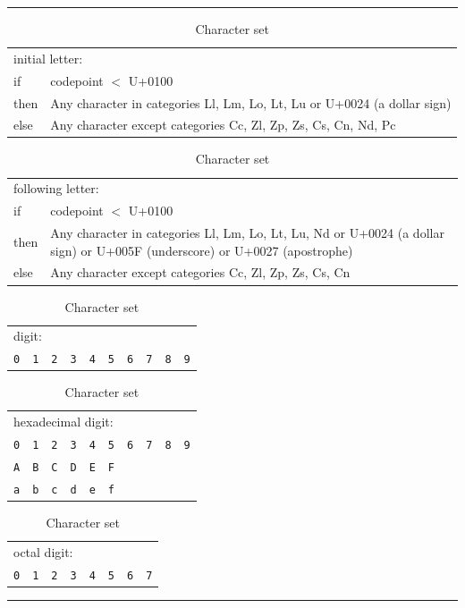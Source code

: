 \documentclass{overturerepchap}
\newcommand{\blankline}{\vspace{\baselineskip}}
\begin{document}
\begin{table}[ht]
\setlength{\tabcolsep}{3.5mm}
\setlength{\arraycolsep}{3.5mm}

\rule{\textwidth}{.5mm}
        \begin{tabular}{lp{13cm}}
        \multicolumn{2}{l}{\rm initial letter:} \\
        if   & codepoint $<$ U+0100 \\
        then &  Any character in categories Ll, Lm, Lo, Lt, Lu or U+0024 (a dollar sign) \\
        else & Any character except categories Cc, Zl, Zp, Zs, Cs,
                Cn, Nd, Pc \\
    \end{tabular}

\blankline
\begin{tabular}{lp{13cm}}
        \multicolumn{2}{l}{following letter: }\\
        if   & codepoint $<$ U+0100 \\
        then & Any character in categories Ll, Lm, Lo, Lt, Lu, Nd or 
               U+0024 (a dollar sign) or U+005F (underscore) or U+0027 (apostrophe) \\
        else & Any character except categories Cc, Zl, Zp, Zs, Cs, Cn 
    \end{tabular}

\blankline
    \begin{tabular}{*{10}{l}}
        \multicolumn{10}{l}{digit:} \\
        {\tt 0}
        & {\tt 1} 
        & {\tt 2} 
        & {\tt 3} 
        & {\tt 4} 
        & {\tt 5}
        & {\tt 6} 
        & {\tt 7} 
        & {\tt 8} 
        & {\tt 9} 
     \end{tabular}

\blankline
    \begin{tabular}{*{10}{l}}
        \multicolumn{10}{l}{hexadecimal digit:} \\
        {\tt 0} & {\tt 1} & {\tt 2} & {\tt 3} & {\tt 4} & {\tt 5} & {\tt 6} & {\tt 7} & {\tt 8} & {\tt 9} \\
        {\tt A} & {\tt B} & {\tt C} & {\tt D} & {\tt E} & {\tt F} \\
        {\tt a} & {\tt b} & {\tt c} & {\tt d} & {\tt e} & {\tt f} 
     \end{tabular}

\blankline
    \begin{tabular}{*{8}{l}}
        \multicolumn{8}{l}{octal digit:} \\
        {\tt 0}
        & {\tt 1} 
        & {\tt 2} 
        & {\tt 3} 
        & {\tt 4} 
        & {\tt 5}
        & {\tt 6} 
        & {\tt 7} 
     \end{tabular}

\rule{\textwidth}{.5mm}
\hypertarget{charSetTable}{\caption{Character set}}
\label{charSetTable}

\end{table}
\end{document}
